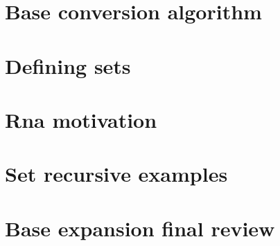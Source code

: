 \section*{Base conversion algorithm}

\vfill
\section*{Defining sets}

\vfill
\section*{Rna motivation}

\vfill
\section*{Set recursive examples}

\vfill
\section*{Base expansion final review}

\vfill
